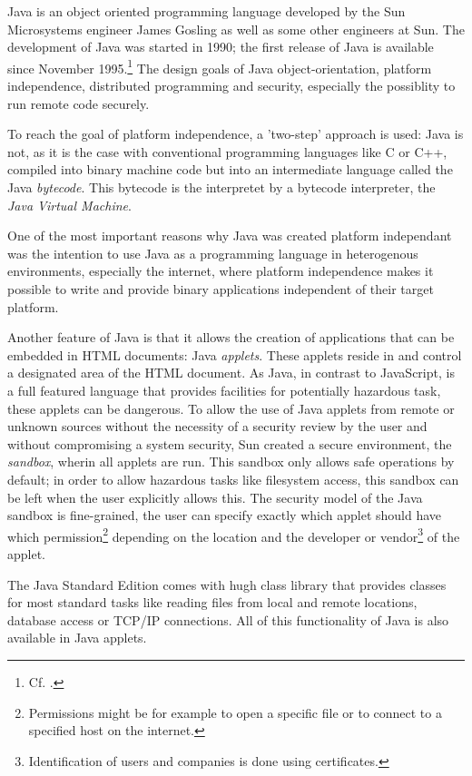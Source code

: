 Java is an object oriented programming language developed by the Sun Microsystems engineer James Gosling as well as some other engineers at Sun. The development of Java was started in 1990; the first release of Java is available since November 1995.\footnote{Cf. \cite{WikiJava}.} The design goals of Java object-orientation, platform independence, distributed programming and security, especially the possiblity to run remote code securely.


To reach the goal of platform independence, a 'two-step' approach is used: Java is not, as it is the case with conventional programming languages like C or C++, compiled into binary machine code but into an intermediate language called the Java \emph{bytecode}. This bytecode is the interpretet by a bytecode interpreter, the \emph{Java Virtual Machine}.

One of the most important reasons why Java was created platform independant was the intention to use Java as a programming language in heterogenous environments, especially the internet, where platform independence makes it possible to write and provide binary applications independent of their target platform.


Another feature of Java is that it allows the creation of applications that can be embedded in HTML documents: Java \emph{applets}. These applets reside in and control a designated area of the HTML document. As Java, in contrast to JavaScript, is a full featured language that provides facilities for potentially hazardous task, these applets can be dangerous. To allow the use of Java applets from remote or unknown sources without the necessity of a security review by the user and without compromising a system security, Sun created a secure environment, the \emph{sandbox}, wherin all applets are run. This sandbox only allows safe operations by default; in order to allow hazardous tasks like filesystem access, this sandbox can be left when the user explicitly allows this. The security model of the Java sandbox is fine-grained, the user can specify exactly which applet should have which permission\footnote{Permissions might be for example to open a specific file or to connect to a specified host on the internet.} depending on the location and the developer or vendor\footnote{Identification of users and companies is done using certificates.} of the applet. 

The Java Standard Edition comes with hugh class library that provides classes for most standard tasks like reading files from local and remote locations, database access or TCP/IP connections. All of this functionality of Java is also available in Java applets.


